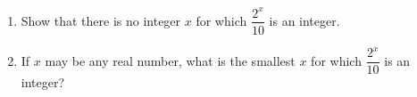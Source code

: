 \begin{enumerate}
\item[(a)] Show that there is no integer $x$ for which $\dfrac{2^x}{10}$ is an integer.
\item[(b)] If $x$ may be any real number, what is the smallest $x$ for which $\dfrac{2^x}{10}$ is an integer?
\end{enumerate}
